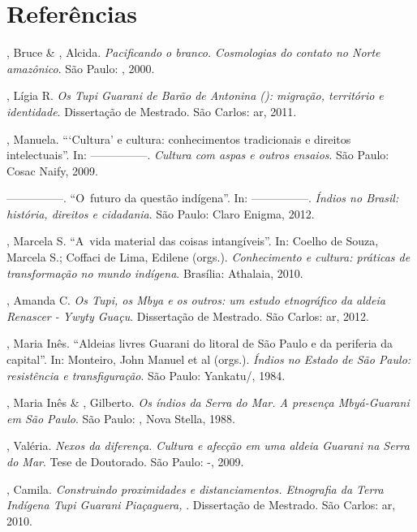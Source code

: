 \section{Referências}

\begin{Parskip}
, Bruce \& , Alcida. \emph{Pacificando o branco. Cosmologias do
contato no Norte amazônico}. São Paulo: , 2000.

, Lígia R. \emph{Os Tupi Guarani de Barão de Antonina (): migração,
território e identidade}. Dissertação de Mestrado. São Carlos: ar,
2011.

, Manuela. ``‘Cultura’ e cultura: conhecimentos
tradicionais e direitos intelectuais''. In: —————. \emph{Cultura com aspas e outros
ensaios}. São Paulo: Cosac Naify, 2009. 

—————. ``O~futuro da questão indígena''. In: —————. \emph{Índios no Brasil: história,
direitos e cidadania}. São Paulo: Claro Enigma, 2012.

, Marcela S. ``A~vida material das coisas intangíveis''.
In: Coelho de Souza, Marcela S.; Coffaci de Lima, Edilene (orgs.).
\emph{Conhecimento e cultura: práticas de transformação no mundo indígena}.
Brasília: Athalaia, 2010.

, Amanda C. \emph{Os Tupi, os Mbya e os outros: um estudo etnográfico da
aldeia Renascer - Ywyty Guaçu}. Dissertação de Mestrado. São Carlos:
ar, 2012. 

, Maria Inês. ``Aldeias livres Guarani do litoral de São Paulo e
da periferia da capital''. In: Monteiro, John Manuel et al (orgs.).
\emph{Índios no Estado de São Paulo: resistência e transfiguração}. São Paulo:
Yankatu/, 1984.

, Maria Inês \& , Gilberto. \emph{Os índios da Serra do Mar. A
presença Mbyá-Guarani em São Paulo}. São Paulo: , Nova Stella, 1988.

, Valéria. \emph{Nexos da diferença. Cultura e afecção em uma aldeia
Guarani na Serra do Mar}. Tese de Doutorado. São Paulo: -,
2009.

, Camila. \emph{Construindo proximidades e distanciamentos. Etnografia
da Terra Indígena Tupi Guarani Piaçaguera, }. Dissertação de Mestrado.
São Carlos: ar, 2010.


\end{Parskip}

